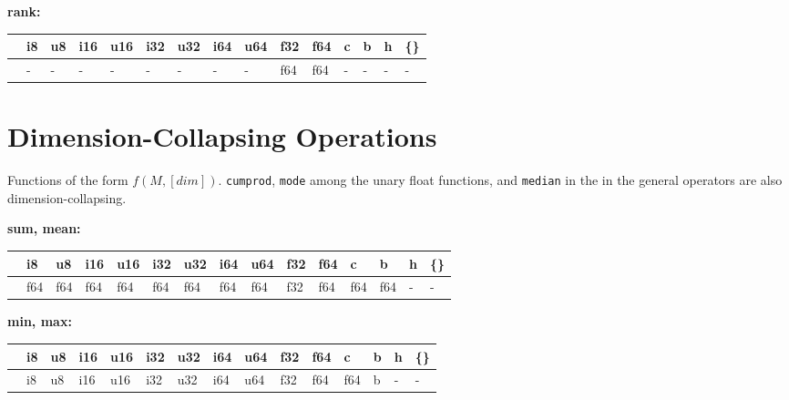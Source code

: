 \textbf{rank:}
\begin{scriptsize}\begin{tt}\begin{center}\vspace{-.3cm}\begin{tabular}{|m{.65cm}||m{.65cm}|m{.65cm}|m{.65cm}|m{.65cm}|m{.65cm}|m{.65cm}|m{.65cm}|m{.65cm}|m{.65cm}|m{.65cm}|m{.65cm}|m{.65cm}|m{.65cm}|m{.65cm}|}\hline 
&i8&u8&i16&u16&i32&u32&i64&u64&f32&f64&c&b&h&\{\}\\ \hline \hline
&-&-&-&-&-&-&-&-&f64&f64&-&-&-&-\\ \hline
\end{tabular}\end{center}\end{tt}\end{scriptsize} 

\section{Dimension-Collapsing Operations}
Functions of the form $f(M, [dim])$. {\tt cumprod}, {\tt mode} among
the unary float functions, and {\tt median} in the in the general
operators are also dimension-collapsing.

\textbf{sum, mean:}
\begin{scriptsize}\begin{tt}\begin{center}\vspace{-.3cm}\begin{tabular}{|m{.65cm}||m{.65cm}|m{.65cm}|m{.65cm}|m{.65cm}|m{.65cm}|m{.65cm}|m{.65cm}|m{.65cm}|m{.65cm}|m{.65cm}|m{.65cm}|m{.65cm}|m{.65cm}|m{.65cm}|}\hline 
&i8&u8&i16&u16&i32&u32&i64&u64&f32&f64&c&b&h&\{\}\\ \hline \hline
&f64&f64&f64&f64&f64&f64&f64&f64&f32&f64&f64&f64&-&-\\ \hline
\end{tabular}\end{center}\end{tt}\end{scriptsize} 

\textbf{min, max:}
\begin{scriptsize}\begin{tt}\begin{center}\vspace{-.3cm}\begin{tabular}{|m{.65cm}||m{.65cm}|m{.65cm}|m{.65cm}|m{.65cm}|m{.65cm}|m{.65cm}|m{.65cm}|m{.65cm}|m{.65cm}|m{.65cm}|m{.65cm}|m{.65cm}|m{.65cm}|m{.65cm}|}\hline 
&i8&u8&i16&u16&i32&u32&i64&u64&f32&f64&c&b&h&\{\}\\ \hline \hline
&i8&u8&i16&u16&i32&u32&i64&u64&f32&f64&f64&b&-&-\\ \hline
\end{tabular}\end{center}\end{tt}\end{scriptsize} 

